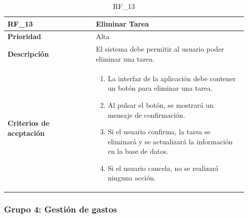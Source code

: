\begin{table}[htb!]
    \begin{tabular}{|p{0.35\linewidth}|p{0.6\linewidth}|}
        \hline
        \rowcolor[HTML]{C0C0C0}  
        \textbf{RF\_13} & \textbf{Eliminar Tarea} \\
        \hline
        \textbf{Prioridad} & Alta \\
        \hline
        \textbf{Descripción} & El sistema debe permitir al usuario poder eliminar una tarea.  \\
        \hline
        \vspace{0.5mm}
        \textbf{Criterios de aceptación} & 
        \begin{minipage}[t]{0.9\linewidth}
            \begin{enumerate}
                \item La interfaz de la aplicación debe contener un botón para eliminar una tarea.
                \item Al pulsar el botón, se mostrará un mensaje de confirmación.
                \item Si el usuario confirma, la tarea se eliminará y se actualizará la información en la base de datos.
                \item Si el usuario cancela, no se realizará ninguna acción.
            \end{enumerate}
            \vspace{2mm}
        \end{minipage} \\
        \hline
    \end{tabular}
    \caption{RF\_13}

\end{table}


\clearpage

\subsubsection{Grupo 4: Gestión de gastos}
\label{subsubsec:grupo4}

